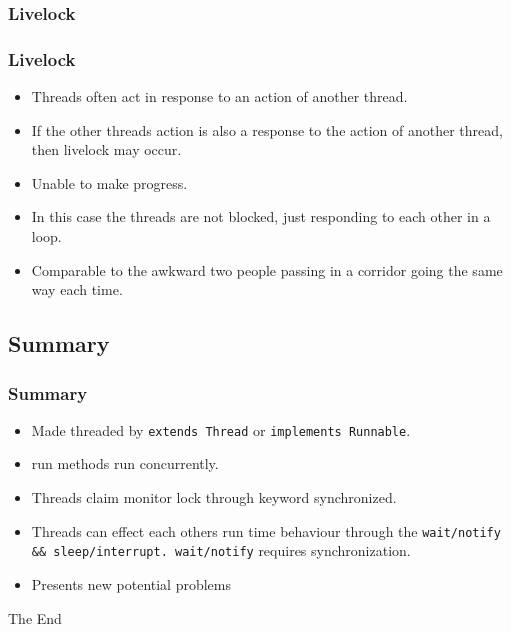 \documentclass{beamer}
\begin{document}
\subsubsection{Livelock}
\begin{frame}
\frametitle{Livelock}
\begin{itemize}
\item {\color{green} Threads} often act in response to an action of another thread. 
\item If the other {\color{green} threads} action is also a response to the action of another thread, then {\color{red} livelock} may occur.
\item Unable to make progress.
\item In this case the {\color{green} threads} are not blocked, just responding to each other in a loop.
\item Comparable to the awkward two people passing in a corridor going the same way each time.
\end{itemize}
\end{frame}
\subsection{Summary}
\begin{frame}
\frametitle{Summary}
\begin{itemize}
\item Made threaded by \texttt{extends Thread} or \texttt{implements Runnable}.
\item run methods run concurrently.
\item Threads claim {\color{red} monitor lock} through keyword {\color{blue} synchronized}.
\item Threads can effect each others run time behaviour through the \texttt{wait/notify \&\& sleep/interrupt. wait/notify} requires {\color{blue} synchronization}.
\item Presents new potential problems
\end{itemize}
\end{frame}
\begin{frame}
\Huge{\centerline{The End}}
\end{frame}

\end{document}
